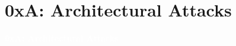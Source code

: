 \documentclass[aspectratio=169]{beamer}
\begin{document}
\section{0xA: Architectural Attacks}
{
\begin{frame}
\huge{\textcolor{white}{\textbf{0xA: Architectural Attacks}}}
\end{frame}
}
\end{document}
